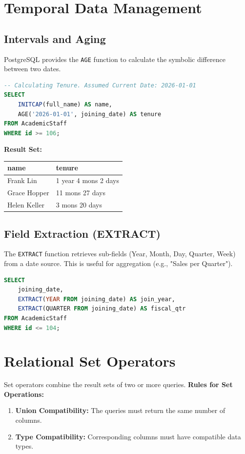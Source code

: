 \documentclass[12pt,a4paper]{article}
\begin{document}
\section{Temporal Data Management}

\subsection{Intervals and Aging}
PostgreSQL provides the \texttt{AGE} function to calculate the symbolic difference between two dates.

\begin{lstlisting}[language=SQL]
-- Calculating Tenure. Assumed Current Date: 2026-01-01
SELECT 
    INITCAP(full_name) AS name, 
    AGE('2026-01-01', joining_date) AS tenure 
FROM AcademicStaff 
WHERE id >= 106;
\end{lstlisting}

\textbf{Result Set:}
\begin{table}[H]
\centering
\begin{tabular}{@{}ll@{}}
\toprule
\textbf{name} & \textbf{tenure} \\ \midrule
Frank Lin & 1 year 4 mons 2 days \\
Grace Hopper & 11 mons 27 days \\
Helen Keller & 3 mons 20 days \\ \bottomrule
\end{tabular}
\end{table}

\subsection{Field Extraction (EXTRACT)}
The \texttt{EXTRACT} function retrieves sub-fields (Year, Month, Day, Quarter, Week) from a date source. This is useful for aggregation (e.g., "Sales per Quarter").

\begin{lstlisting}[language=SQL]
SELECT 
    joining_date, 
    EXTRACT(YEAR FROM joining_date) AS join_year,
    EXTRACT(QUARTER FROM joining_date) AS fiscal_qtr
FROM AcademicStaff 
WHERE id <= 104;
\end{lstlisting}

\newpage
\section{Relational Set Operators}
Set operators combine the result sets of two or more queries.
\textbf{Rules for Set Operations:}
\begin{enumerate}
    \item \textbf{Union Compatibility:} The queries must return the same number of columns.
    \item \textbf{Type Compatibility:} Corresponding columns must have compatible data types.
\end{enumerate}
\end{document}
